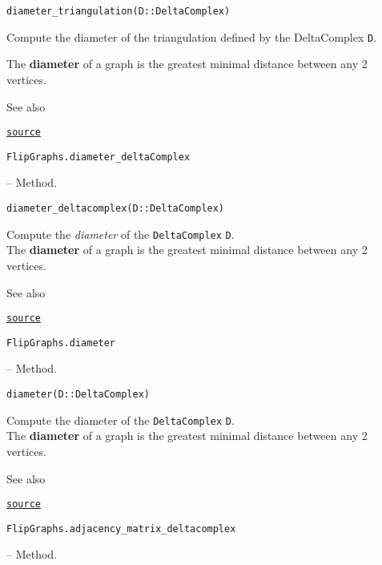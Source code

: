 \begin{adjustwidth}{2em}{0pt}


\begin{verbatim}
diameter_triangulation(D::DeltaComplex)
\end{verbatim}

Compute the diameter of the triangulation defined by the DeltaComplex \texttt{D}.

The \textbf{diameter} of a graph is the greatest minimal distance between any 2 vertices.

See also 



\href{https://github.com/schto223/FlipGraphs.jl/blob/490c01a7adf74b42f27dda05099165c47ae8133e/src/deltaComplex.jl#L511-L519}{\texttt{source}}


\end{adjustwidth}
\hypertarget{17984212332069823233}{\texttt{FlipGraphs.diameter\_deltaComplex}}  -- {Method.}

\begin{adjustwidth}{2em}{0pt}


\begin{verbatim}
diameter_deltacomplex(D::DeltaComplex)
\end{verbatim}

Compute the \emph{diameter} of the \texttt{DeltaComplex} \texttt{D}.\\
 The \textbf{diameter} of a graph is the greatest minimal distance between any 2 vertices.

See also 



\href{https://github.com/schto223/FlipGraphs.jl/blob/490c01a7adf74b42f27dda05099165c47ae8133e/src/deltaComplex.jl#L483-L491}{\texttt{source}}


\end{adjustwidth}
\hypertarget{8391561643002151248}{\texttt{FlipGraphs.diameter}}  -- {Method.}

\begin{adjustwidth}{2em}{0pt}


\begin{verbatim}
diameter(D::DeltaComplex)
\end{verbatim}

Compute the diameter of the \texttt{DeltaComplex} \texttt{D}.\\
 The \textbf{diameter} of a graph is the greatest minimal distance between any 2 vertices.

See also 



\href{https://github.com/schto223/FlipGraphs.jl/blob/490c01a7adf74b42f27dda05099165c47ae8133e/src/deltaComplex.jl#L496-L504}{\texttt{source}}


\end{adjustwidth}
\hypertarget{16623789823786931701}{\texttt{FlipGraphs.adjacency\_matrix\_deltacomplex}}  -- {Method.}


